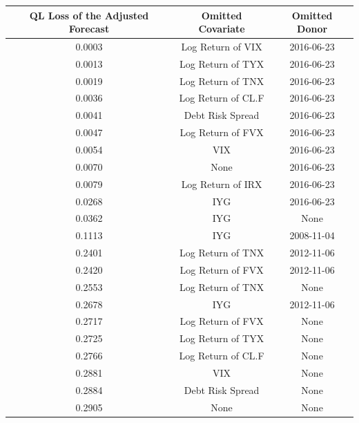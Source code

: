 \documentclass[11pt,3p,review,authoryear]{elsarticle}
\theoremstyle{definition}
\begin{document}
  \begin{table}[ht]
    \centering
     \label{tab:prediction_table_with Brexit as June 23rd, 2016} 
    \begingroup\fontsize{7pt}{8pt}\selectfont
    \begin{tabular}{ccc}
      
      \hline
   QL Loss of the Adjusted Forecast& Omitted Covariate & Omitted Donor \\ 
      \hline
      0.0003 & Log Return of VIX & 2016-06-23 \\ 
  0.0013 & Log Return of TYX & 2016-06-23 \\ 
  0.0019 & Log Return of TNX & 2016-06-23 \\ 
  0.0036 & Log Return of CL.F & 2016-06-23 \\ 
  0.0041 & Debt Risk Spread & 2016-06-23 \\ 
  0.0047 & Log Return of FVX & 2016-06-23 \\ 
  0.0054 & VIX & 2016-06-23 \\ 
  0.0070 & None & 2016-06-23 \\ 
  0.0079 & Log Return of IRX & 2016-06-23 \\ 
  0.0268 & IYG & 2016-06-23 \\ 
  0.0362 & IYG & None \\ 
  0.1113 & IYG & 2008-11-04 \\ 
  0.2401 & Log Return of TNX & 2012-11-06 \\ 
  0.2420 & Log Return of FVX & 2012-11-06 \\ 
  0.2553 & Log Return of TNX & None \\ 
  0.2678 & IYG & 2012-11-06 \\ 
  0.2717 & Log Return of FVX & None \\ 
  0.2725 & Log Return of TYX & None \\ 
  0.2766 & Log Return of CL.F & None \\ 
  0.2881 & VIX & None \\ 
  0.2884 & Debt Risk Spread & None \\ 
  \rowcolor{yellow} 0.2905 & None & None \\ 

\end{tabular}
\end{table}
\end{document}
